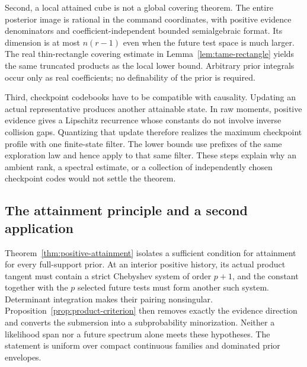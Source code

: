 Second, a local attained cube is not a global covering theorem. The
entire posterior image is rational in the command coordinates, with
positive evidence denominators and coefficient-independent bounded
semialgebraic format. Its dimension is at most $n(r-1)$ even when the
future test space is much larger. The real thin-rectangle covering
estimate in Lemma~\ref{lem:tame-rectangle} yields the same truncated
products as the local lower bound. Arbitrary prior integrals occur only
as real coefficients; no definability of the prior is required.

Third, checkpoint codebooks have to be compatible with causality.
Updating an actual representative produces another attainable state.
In raw moments, positive evidence gives a Lipschitz recurrence whose
constants do not involve inverse collision gaps. Quantizing that update
therefore realizes the maximum checkpoint profile with one finite-state
filter. The lower bounds use prefixes of the same exploration law and
hence apply to that same filter. These steps explain why an ambient
rank, a spectral estimate, or a collection of independently chosen
checkpoint codes would not settle the theorem.

\subsection{The attainment principle and a second application}
Theorem~\ref{thm:positive-attainment} isolates a sufficient condition for
attainment for every full-support prior. At an interior positive history,
its actual product tangent must contain a strict Chebyshev system of
order $p+1$, and the constant together with the $p$ selected future tests
must form another such system. Determinant integration makes their
pairing nonsingular. Proposition~\ref{prop:product-criterion} then removes
exactly the evidence direction and converts the submersion into a
subprobability minorization. Neither a likelihood span nor a future
spectrum alone meets these hypotheses. The statement is uniform over
compact continuous families and dominated prior envelopes.

